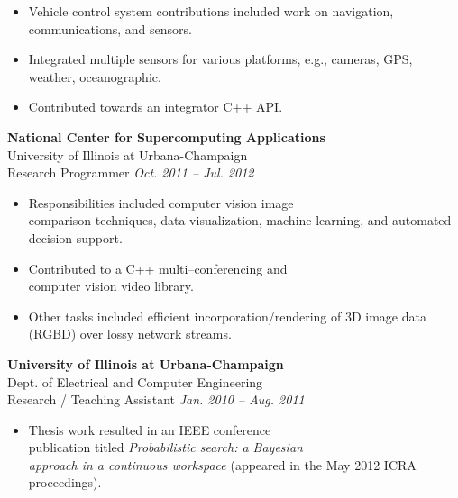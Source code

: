 \documentclass{article}
\begin{document}
{\begin{multicols}{2}
\begin{itemize}[noitemsep,nolistsep]
        \item Vehicle control system contributions included work on navigation, communications, and sensors.
        \item Integrated multiple sensors for various platforms, e.g., cameras, GPS, weather, oceanographic.
        \item Contributed towards an integrator C++ API.
    \end{itemize}
    \vspace{10px}
    \textbf{National Center for Supercomputing Applications}\\
    University of Illinois at Urbana-Champaign\\
    Research Programmer \hfill \textsl{Oct. 2011 -- Jul. 2012}\\
    \vspace{ -10px}
    \begin{itemize}[noitemsep,nolistsep]
        \item Responsibilities included computer vision image \\comparison techniques, data visualization, machine learning, and automated decision support. 
        \item Contributed to a C++ multi--conferencing and \\computer vision video library.  
        \item Other tasks included efficient incorporation/rendering of 3D image data (RGBD) over lossy network streams.  
    \end{itemize}
    \vspace{10px}
    \textbf{University of Illinois at Urbana-Champaign}\\ 
    Dept. of Electrical and Computer Engineering\\
    Research / Teaching Assistant \hfill \textsl{Jan. 2010 -- Aug. 2011} \\
    \vspace{ -10px}
    \begin{itemize}[noitemsep,nolistsep]
	 \item Thesis work resulted in an IEEE conference \\publication titled \textsl{Probabilistic search: a Bayesian \\approach in a continuous workspace} (appeared in the May 2012 ICRA proceedings).  

\end{itemize}
\end{multicols}}
\end{document}
